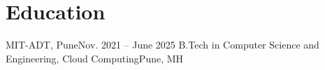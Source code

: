 \section{Education}
  \resumeSubHeadingListStart
    \resumeSubheading
      {MIT-ADT, Pune}{Nov. 2021 -- June 2025}
      {B.Tech in Computer Science and Engineering, Cloud Computing}{Pune, MH}
  \resumeSubHeadingListEnd
